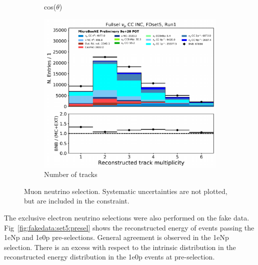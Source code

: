 \begin{figure}[H]
\begin{center}
\begin{subfigure}[b]{0.3\textwidth}
    \caption{\label{fig:fakedata:set5:numu_costheta} cos($\theta$)}
    \end{subfigure}
    \begin{subfigure}[b]{0.3\textwidth}
    \centering
    \includegraphics[width=1.00\textwidth]{Fakedata/set5/numu_ntracks.pdf}
    \caption{\label{fig:fakedata:set5:numu_ntracks} Number of tracks}
    \end{subfigure}
\caption{\label{fig:fakedata:set5:numu} Muon neutrino selection. Systematic uncertainties are not plotted, but are included in the constraint.}
\end{center}
\end{figure}

The exclusive electron neutrino selections were also performed on the fake data. Fig~\ref{fig:fakedata:set5:presel} shows the reconstructed energy of events passing the 1eNp and 1e0p pre-selections.  General agreement is observed in the 1eNp selection.  There is an excess with respect to the \nue intrinsic distribution in the reconstructed energy distribution in the 1e0p events at pre-selection.

